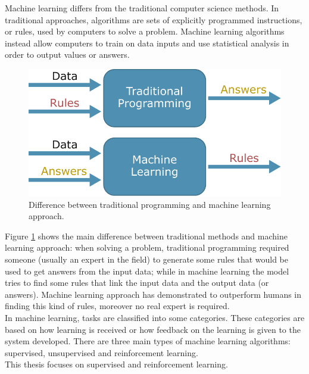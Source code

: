 Machine learning differs from the traditional computer science methods.  In traditional approaches, algorithms are sets of explicitly programmed instructions, or rules, used by computers to solve a problem. Machine learning algorithms instead allow computers to train on data inputs and use statistical analysis in order to output values or answers. \\

\begin{figure}[H]
\centering
    \includegraphics[width=.45\linewidth]{images/Background/ML/MLvstrad.pdf}
\caption[Traditional and machine learning approaches]{Difference between traditional programming and machine learning approach.}
\label{fig:tradvsml}
\end{figure}

\noindent Figure \ref{fig:tradvsml} shows the main difference between traditional methods and machine learning approach: when solving a problem, traditional programming required someone (usually an expert in the field) to generate some rules that would be used to get answers from the input data; while in machine learning the model tries to find some rules that link the input data and the output data (or answers). Machine learning approach has demonstrated to outperform humans in finding this kind of rules, moreover no real expert is required. \\

In machine learning, tasks are classified into some categories. These categories are based on how learning is received or how feedback on the learning is given to the system developed.
There are three main types of machine learning algorithms: supervised, unsupervised and reinforcement learning.\\
This thesis focuses on supervised and reinforcement learning.

